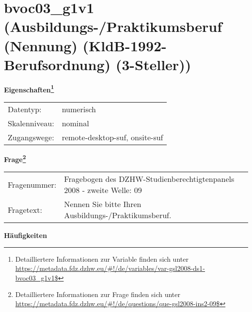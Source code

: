 
    \setcounter{footnote}{0}

    \vspace*{-1.8cm}
	\section{bvoc03\_g1v1 (Ausbildungs-/Praktikumsberuf (Nennung) (KldB-1992-Berufsordnung) (3-Steller))}
	\label{section:bvoc03_g1v1}



    \vspace*{0.5cm}
    \noindent\textbf{Eigenschaften\footnote{Detailliertere Informationen zur Variable finden sich unter
		\url{https://metadata.fdz.dzhw.eu/\#!/de/variables/var-gsl2008-ds1-bvoc03_g1v1$}}}\\
	\begin{tabularx}{\hsize}{@{}lX}
	Datentyp: & numerisch \\
	Skalenniveau: & nominal \\
	Zugangswege: &
	  remote-desktop-suf, 
	  onsite-suf
 \\
    \end{tabularx}



				\vspace*{0.5cm}
                \noindent\textbf{Frage\footnote{Detailliertere Informationen zur Frage finden sich unter
		              \url{https://metadata.fdz.dzhw.eu/\#!/de/questions/que-gsl2008-ins2-09$}}}\\
				\begin{tabularx}{\hsize}{@{}lX}
					Fragenummer: &
					  Fragebogen des DZHW-Studienberechtigtenpanels 2008 - zweite Welle:
					  09
 \\
					Fragetext: & Nennen Sie bitte Ihren Ausbildungs-/Praktikumsberuf. \\
				\end{tabularx}





        		\vspace*{0.5cm}
                \noindent\textbf{Häufigkeiten}

